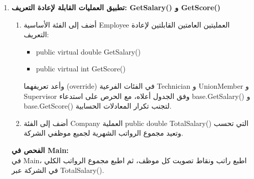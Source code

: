 \documentclass[14pt]{extarticle}
\begin{document}
\begin{enumerate}[resume, label=\textbf{تمرين \arabic*:}, wide=0pt, leftmargin=*, itemsep=2em]

    \item \textbf{تطبيق العمليات القابلة لإعادة التعريف: \textenglish{GetSalary()} و \textenglish{GetScore()}}
    \begin{enumerate}[label=\textbf{(\arabic*)}]
        \item أضف إلى الفئة الأساسية \textenglish{Employee} العمليتين العامتين القابلتين لإعادة التعريف:
        \begin{itemize}
            \item \textenglish{public virtual double GetSalary()}
            \item \textenglish{public virtual int GetScore()}
        \end{itemize}
        وأعد تعريفهما (\textenglish{override}) في الفئات الفرعية \textenglish{Technician} و \textenglish{UnionMember} و \textenglish{Supervisor} وفق الجدول أعلاه، مع الحرص على استدعاء \textenglish{base.GetSalary()} و \textenglish{base.GetScore()} لتجنب تكرار المعادلات الحسابية.
        \item أضف إلى الفئة \textenglish{Company} العملية \textenglish{public double TotalSalary()} التي تحسب وتعيد مجموع الرواتب الشهرية لجميع موظفي الشركة.
    \end{enumerate}
    \textbf{الفحص في \textenglish{Main}:} \\
    في \textenglish{Main}، اطبع راتب ونقاط تصويت كل موظف، ثم اطبع مجموع الرواتب الكلي في الشركة عبر \textenglish{TotalSalary()}.


\end{enumerate}
\end{document}
